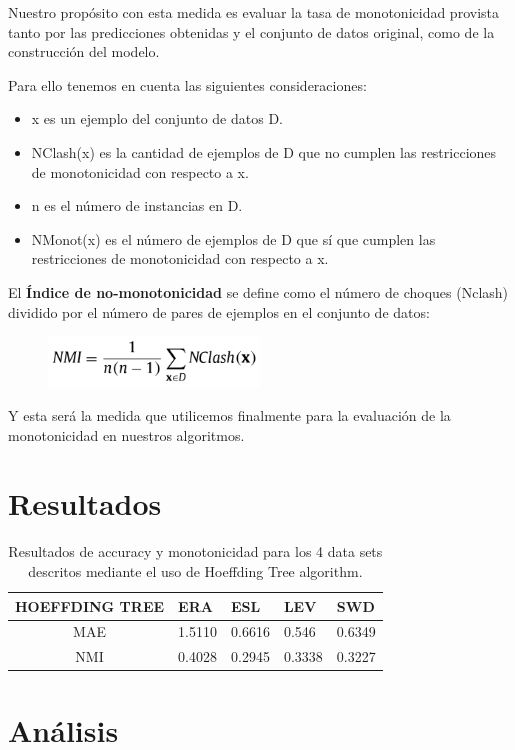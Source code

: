 Nuestro propósito con esta medida es evaluar la tasa de monotonicidad provista tanto por las predicciones obtenidas y el conjunto de datos original, como de la construcción del modelo.

Para ello tenemos en cuenta las siguientes consideraciones:
\begin{itemize}
	\item x es un ejemplo del conjunto de datos D.
	\item NClash(x) es la cantidad de ejemplos de D que no cumplen las restricciones de monotonicidad con respecto a x.
	\item n es el número de instancias en D.
	\item NMonot(x) es el número de ejemplos de D que sí que cumplen las restricciones de monotonicidad con respecto a x.
\end{itemize}

El \textbf{Índice de no-monotonicidad} se define como el número de choques (Nclash) dividido por el número de pares de ejemplos en el conjunto de datos:

\begin{figure}[H]
	\centering
	\includegraphics[width=0.5\textwidth]{imagenes/f8} 
\end{figure}

Y esta será la medida que utilicemos finalmente para la evaluación de la monotonicidad en nuestros algoritmos.

\section{Resultados}

\begin{table}[H]
	\begin{tabular}{|c|l|l|l|l|}
		\hline
		HOEFFDING TREE & ERA    & ESL    & LEV &  SWD \\ \hline
		MAE & 1.5110 & 0.6616 & 0.546                      & 0.6349                     \\ \hline
		NMI & 0.4028 & 0.2945 & 0.3338                     & 0.3227                     \\ \hline
	\end{tabular}
\caption{Resultados de accuracy y monotonicidad para los 4 data sets descritos mediante el uso de Hoeffding Tree algorithm.}
\end{table}

\section{Análisis}

\newpage











